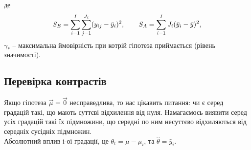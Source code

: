 де \[ S_E = \displaystyle\sum\limits_{i=1}^I\displaystyle\sum\limits_{j=1}^{J_i}(y_{ij}-\bar{y}_i)^2, \qquad S_A = \displaystyle\sum\limits_{i=1}^I J_i(\bar{y}_i -\bar{y})^2,\] $\gamma_*$ -- максимальна ймовірність при котрій гіпотеза приймається (рівень значимості).


\subsection{Перевірка контрастів}

Якщо гіпотеза $\vec\mu=\vec0$ несправедлива, то нас цікавить питання: чи є серед градацій такі, що мають суттєві відхилення від нуля. Намагаємось виявити серед усіх градацій такі їх підмножини, що середні по ним несуттєво відхиляються від середніх сусідніх підмножин. \\

Абсолютний вплив $і$-ої градації, це $\theta_t=\mu-\mu_i$, та $\widehat{\theta}=\bar{y}_i$.